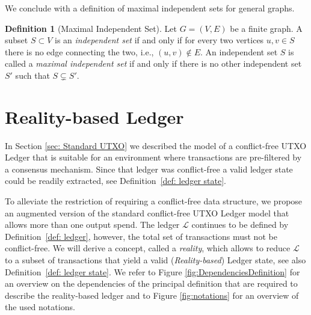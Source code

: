 \documentclass[11pt]{article}
\newcommand{\ledger}{\mathcal{L}}
\theoremstyle{plain}
\theoremstyle{definition}
\newtheorem{definition}{Definition}
\numberwithin{definition}{section}
\numberwithin{lemma}{section}
\numberwithin{ass}{section}
\numberwithin{remark}{section}
\numberwithin{example}{section}
\numberwithin{proposition}{section}
\numberwithin{theorem}{section}
\begin{document}
We conclude with a definition of maximal independent sets for general graphs.

\begin{definition}[Maximal Independent Set]\label{def: maximal independent set}
Let ${G}=(V,E)$ be a finite graph. A subset $S\subset V$ is an \emph{independent set} if and only if for every two vertices $u,v \in S$  there is no edge connecting the two, i.e., $(u,v)\notin E$. An independent set $S$ is called a \emph{maximal independent set} if and only if there is no other independent set $S'$ such that  $S\subsetneq S'$.
\end{definition}




\section{Reality-based Ledger}\label{sec: Reality-based Ledger}


In Section \ref{sec: Standard UTXO} we described the model of a conflict-free UTXO Ledger that is suitable for an environment where transactions are pre-filtered by a consensus mechanism. Since that ledger was conflict-free a valid ledger state could be readily extracted, see Definition~\ref{def: ledger state}.

To alleviate the restriction of requiring a conflict-free data structure, we propose an augmented version of the standard conflict-free UTXO Ledger model that allows more than one output spend. The ledger $\ledger$ continues to be defined by Definition~\ref{def: ledger}, however, the total set of transactions must not be conflict-free. We will derive a concept, called a \textit{reality}, which allows to reduce $\ledger$ to a subset of transactions that yield a valid (\textit{Reality-based}) Ledger state, see also Definition~\ref{def: ledger state}. We refer to Figure \ref{fig:DependenciesDefinition} for an overview on the dependencies of the principal definition that are required to describe the reality-based ledger and to Figure \ref{fig:notations} for an overview of the used notations.

\end{document}

